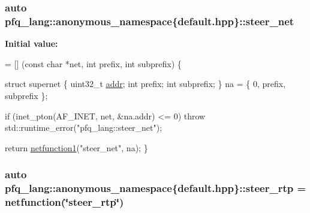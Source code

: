 \hypertarget{namespacepfq__lang_1_1anonymous__namespace_02default_8hpp_03_a2c53e95204f3841919f780940b607d68}{
\subsubsection[{steer\+\_\+net}]{\setlength{\rightskip}{0pt plus 5cm}auto pfq\+\_\+lang\+::anonymous\+\_\+namespace\{default.\+hpp\}\+::steer\+\_\+net}}\label{namespacepfq__lang_1_1anonymous__namespace_02default_8hpp_03_a2c53e95204f3841919f780940b607d68}
{\bfseries Initial value\+:}
\begin{DoxyCode}
= [] (\textcolor{keyword}{const} \textcolor{keywordtype}{char} *net, \textcolor{keywordtype}{int} prefix, \textcolor{keywordtype}{int} subprefix) \{

                                \textcolor{keyword}{struct }supernet \{
                                    uint32\_t \hyperlink{namespacepfq__lang_1_1anonymous__namespace_02default_8hpp_03_aafce8334d1be83bff9a2115439c8c453}{addr};
                                    \textcolor{keywordtype}{int}      prefix;
                                    \textcolor{keywordtype}{int}      subprefix;
                                \} na = \{ 0, prefix, subprefix \};

                                \textcolor{keywordflow}{if} (inet\_pton(AF\_INET, net, &na.addr) <= 0)
                                    \textcolor{keywordflow}{throw} std::runtime\_error(\textcolor{stringliteral}{"pfq\_lang::steer\_net"});

                                \textcolor{keywordflow}{return} \hyperlink{namespacepfq__lang_af215f25fa7ebd61fdc90cf0ef78a3164}{netfunction1}(\textcolor{stringliteral}{"steer\_net"}, na);
                             \}
\end{DoxyCode}
\hypertarget{namespacepfq__lang_1_1anonymous__namespace_02default_8hpp_03_a16b18fdc10f8dd8c0974d9f0d6c13af9}{
\subsubsection[{steer\+\_\+rtp}]{\setlength{\rightskip}{0pt plus 5cm}auto pfq\+\_\+lang\+::anonymous\+\_\+namespace\{default.\+hpp\}\+::steer\+\_\+rtp = {\bf netfunction}(\char`\"{}steer\+\_\+rtp\char`\"{})}}\label{namespacepfq__lang_1_1anonymous__namespace_02default_8hpp_03_a16b18fdc10f8dd8c0974d9f0d6c13af9}
